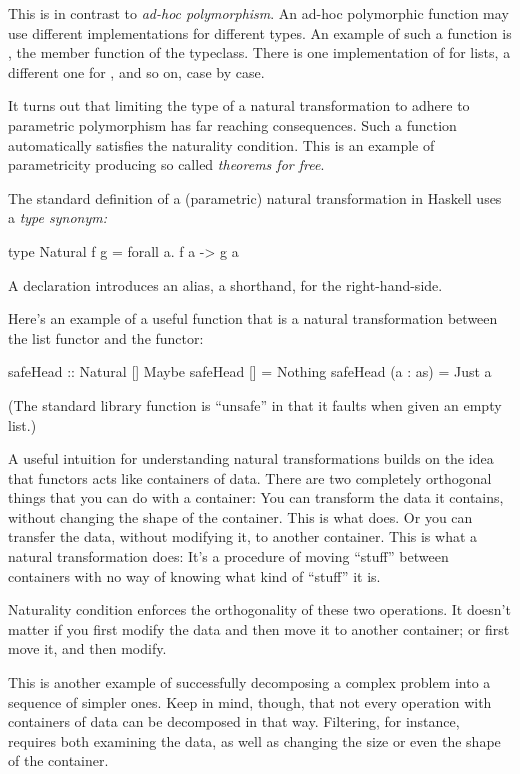 \documentclass[DaoFP]{subfiles}
\begin{document}
This is in contrast to \emph{ad-hoc polymorphism}. An ad-hoc polymorphic function may use different implementations for different types. An example of such a function is , the member function of the  typeclass. There is one implementation of  for lists, a different one for , and so on, case by case. 

It turns out that limiting the type of a natural transformation to adhere to parametric polymorphism has far reaching consequences. Such a function automatically satisfies the naturality condition. This is an example of parametricity producing so called \emph{theorems for free}. 

The standard definition of a (parametric) natural transformation in Haskell uses a \emph{type synonym:}
\begin{haskell}
type Natural f g = forall a. f a -> g a
\end{haskell}
A  declaration introduces an alias, a shorthand, for the right-hand-side.

Here's an example of a useful function that is a natural transformation between the list functor and the  functor:
\begin{haskell}
safeHead :: Natural [] Maybe
safeHead [] = Nothing
safeHead (a : as) = Just a
\end{haskell}
(The standard library  function is ``unsafe'' in that it faults when given an empty list.)

A useful intuition for understanding natural transformations builds on the idea that functors acts like containers of data. There are two completely orthogonal things that you can do with a container: You can transform the data it contains, without changing the shape of the container. This is what  does. Or you can transfer the data, without modifying it, to another container. This is what a natural transformation does: It's a procedure of moving ``stuff'' between containers with no way of knowing what kind of ``stuff'' it is. 

Naturality condition enforces the orthogonality of these two operations. It doesn't matter if you first modify the data and then move it to another container; or first move it, and then modify. 

This is another example of successfully decomposing a complex problem into a sequence of simpler ones. Keep in mind, though, that not every operation with containers of data can be decomposed in that way. Filtering, for instance, requires both examining the data, as well as changing the size or even the shape of the container. 
\end{document}
